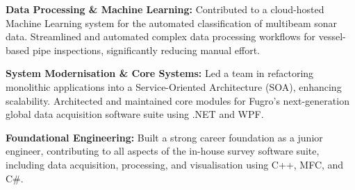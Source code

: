 \begin{cventries}
{\begin{cvitems}
        \item {\textbf{Data Processing \& Machine Learning:} Contributed to a cloud-hosted Machine Learning system for the automated classification of multibeam sonar data. Streamlined and automated complex data processing workflows for vessel-based pipe inspections, significantly reducing manual effort.}
        \item {\textbf{System Modernisation \& Core Systems:} Led a team in refactoring monolithic applications into a Service-Oriented Architecture (SOA), enhancing scalability. Architected and maintained core modules for Fugro's next-generation global data acquisition software suite using .NET and WPF.}
        \item {\textbf{Foundational Engineering:} Built a strong career foundation as a junior engineer, contributing to all aspects of the in-house survey software suite, including data acquisition, processing, and visualisation using C++, MFC, and C\#.}
      \end{cvitems}
    }
\end{cventries}

